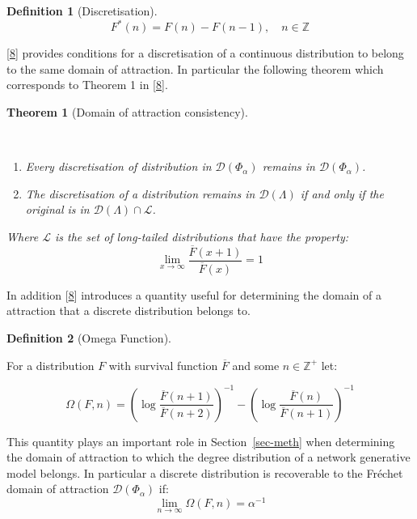 \documentclass[
  10pt,
  a4paper,
]{scrreprt}
\providecommand{\tightlist}{%
  \setlength{\itemsep}{0pt}\setlength{\parskip}{0pt}}\usepackage{longtable,booktabs,array}
\theoremstyle{plain}
\theoremstyle{definition}
\newtheorem{definition}{Definition}[section]
\theoremstyle{plain}
\newtheorem{theorem}{Theorem}[section]
\theoremstyle{remark}
\begin{document}
{\begin{definition}[Discretisation]
\[F^*(n) = F(n) - F(n-1), \quad n   \in \mathbb Z\]

\end{definition}

{[}\protect\hyperlink{ref-shimura12}{8}{]} provides conditions for a
discretisation of a continuous distribution to belong to the same domain
of attraction. In particular the following theorem which corresponds to
Theorem 1 in {[}\protect\hyperlink{ref-shimura12}{8}{]}.

\begin{theorem}[Domain of attraction
consistency]\protect\hypertarget{thm-shimura1}{}\label{thm-shimura1}

~

\begin{enumerate}
\def\labelenumi{(\alph{enumi})}
\tightlist
\item
  Every discretisation of distribution in \(\mathcal D(\Phi_\alpha)\)
  remains in \(\mathcal D(\Phi_\alpha)\).
\item
  The discretisation of a distribution remains in
  \(\mathcal D(\Lambda)\) if and only if the original is in
  \(\mathcal D(\Lambda)\cap \mathcal L\).
\end{enumerate}

Where \(\mathcal L\) is the set of long-tailed distributions that have
the property: \[
\lim_{x\rightarrow \infty}\displaystyle\frac{\overline F(x+1)}{\overline F(x)} = 1   
\]

\end{theorem}

In addition {[}\protect\hyperlink{ref-shimura12}{8}{]} introduces a
quantity useful for determining the domain of a attraction that a
discrete distribution belongs to.

\begin{definition}[Omega
Function]\protect\hypertarget{def-omega}{}\label{def-omega}

For a distribution \(F\) with survival function \(\overline F\) and some
\(n\in\mathbb Z^+\) let:

\[
\Omega(F,n) = \left(\log\displaystyle\frac{\overline F (n+1)}{\overline F (n+2)}\right)^{-1} - \left(\log\displaystyle\frac{\overline F (n)}{\overline F (n+1)}\right)^{-1}
\]

\end{definition}

This quantity plays an important role in Section~\ref{sec-meth} when
determining the domain of attraction to which the degree distribution of
a network generative model belongs. In particular a discrete
distribution is recoverable to the Fréchet domain of attraction
\(\mathcal D(\Phi_\alpha)\) if: \[
\lim_{n\rightarrow\infty}\Omega(F,n) = \alpha^{-1}
\]

}
\end{document}
